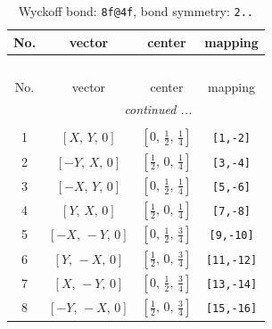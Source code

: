 \documentclass[fleqn,8pt]{jsarticle}
\begin{document}
\begin{longtable}{cccc}
\caption{Wyckoff bond: {\tt 8f@4f}, bond symmetry: {\tt 2..}}
 \\
 \hline \hline
No. & vector & center & mapping \\ \hline \endfirsthead

\multicolumn{3}{l}{\tablename\ \thetable{}} \\
 \hline \hline
No. & vector & center & mapping \\ \hline \endhead

 \hline \hline
\multicolumn{3}{r}{\footnotesize\it continued ...} \\ \endfoot

 \hline \hline
\multicolumn{3}{r}{} \\ \endlastfoot

1 & $\left[ X,\, Y,\, 0 \right]$ & $\left[ 0,\, \frac{1}{2},\, \frac{1}{4} \right]$ & {\tt [1,-2]} \\ \hline
2 & $\left[ - Y,\, X,\, 0 \right]$ & $\left[ \frac{1}{2},\, 0,\, \frac{1}{4} \right]$ & {\tt [3,-4]} \\ \hline
3 & $\left[ - X,\, Y,\, 0 \right]$ & $\left[ 0,\, \frac{1}{2},\, \frac{1}{4} \right]$ & {\tt [5,-6]} \\ \hline
4 & $\left[ Y,\, X,\, 0 \right]$ & $\left[ \frac{1}{2},\, 0,\, \frac{1}{4} \right]$ & {\tt [7,-8]} \\ \hline
5 & $\left[ - X,\, - Y,\, 0 \right]$ & $\left[ 0,\, \frac{1}{2},\, \frac{3}{4} \right]$ & {\tt [9,-10]} \\ \hline
6 & $\left[ Y,\, - X,\, 0 \right]$ & $\left[ \frac{1}{2},\, 0,\, \frac{3}{4} \right]$ & {\tt [11,-12]} \\ \hline
7 & $\left[ X,\, - Y,\, 0 \right]$ & $\left[ 0,\, \frac{1}{2},\, \frac{3}{4} \right]$ & {\tt [13,-14]} \\ \hline
8 & $\left[ - Y,\, - X,\, 0 \right]$ & $\left[ \frac{1}{2},\, 0,\, \frac{3}{4} \right]$ & {\tt [15,-16]} \\
\end{longtable}
\renewcommand{\arraystretch}{1.2}
\end{document}
